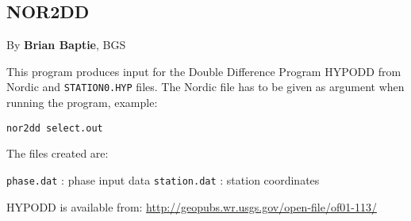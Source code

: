 
\subsection{NOR2DD} 

By \textbf{Brian Baptie}, BGS 

This program produces input for the Double Difference Program HYPODD  \citep{waldhauser2001,waldhauser2002} from Nordic and \texttt{STATION0.HYP} files. The Nordic file has to be given as argument when running the program, example: 

\texttt{nor2dd select.out}

The files created are: 

\texttt{phase.dat} : phase input data\newline
\texttt{station.dat} : station coordinates 

HYPODD is available from: \url{http://geopubs.wr.usgs.gov/open-file/of01-113/} 

